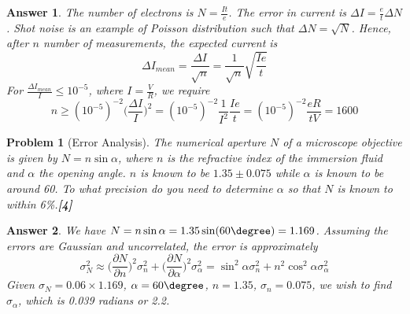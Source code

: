 \documentclass[a4paper]{article}
\newtheorem{ans}{Answer}[subsection]
\theoremstyle{new}
\newtheorem{qns}{Problem}[subsection]
\begin{document}
\begin{ans}
The number of electrons is $N=\frac{It}{e}$. The error in current is $\Delta I=\frac{e}{t}\Delta N$. Shot noise is an example of Poisson distribution such that $\Delta N=\sqrt{N}$. Hence, after $n$ number of measurements, the expected current is
$$\Delta I_{mean}=\frac{\Delta I}{\sqrt{n}}=\frac{1}{\sqrt{n}}\sqrt{\frac{Ie}{t}}$$
For $\frac{\Delta I_{mean}}{I}\leq 10^{-5}$, where $I=\frac{V}{R}$, we require
$$n\geq (10^{-5})^{-2}\bigg(\frac{\Delta I}{I}\bigg)^2=(10^{-5})^{-2}\frac{1}{I^2}\frac{Ie}{t}=(10^{-5})^{-2}\frac{eR}{tV}=1600$$
\end{ans}
\begin{qns}[Error Analysis]
The numerical aperture $N$ of a microscope objective is given by $N = n \sin\alpha$, where $n$ is the refractive index of the immersion fluid and $\alpha$ the opening angle. $n$ is known to be $1.35\pm0.075$ while $\alpha$ is known to be around 60\degree. To what precision do you need to determine $\alpha$ so that $N$ is known to within 6\%.\hfill\textbf{[4]}
\end{qns}
\begin{ans}
We have $N=n\sin\alpha=1.35\sin(60\degree)=1.169$. Assuming the errors are Gaussian and uncorrelated, the error is approximately
$$\sigma_N^2\approx\bigg(\frac{\partial N}{\partial n}\bigg)^2\sigma_n^2+\bigg(\frac{\partial N}{\partial\alpha}\bigg)^2\sigma_\alpha^2=\sin^2\alpha\sigma_n^2+n^2\cos^2\alpha\sigma_\alpha^2$$
Given $\sigma_N=0.06\times 1.169$, $\alpha=60\degree$, $n=1.35$, $\sigma_n=0.075$, we wish to find $\sigma_\alpha$, which is 0.039 radians or 2.2\degree.
\end{ans}
\newpage
\end{document}
